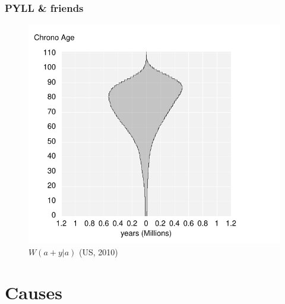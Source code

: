 \documentclass{beamer}
\begin{document}
\begin{frame}
\frametitle{PYLL \& friends}
\vspace{-1cm}
\begin{figure}[b]
    \centering
    \includegraphics[scale=.7]{Figures/f6_AgesWon.pdf}
    \caption{$W(a+y|a)$ (US, 2010)}
\end{figure} 
\end{frame}

\section{Causes}
\begin{frame}

\end{frame}

\begin{frame}

\end{frame}

\begin{frame}

\end{frame}
\end{document}
